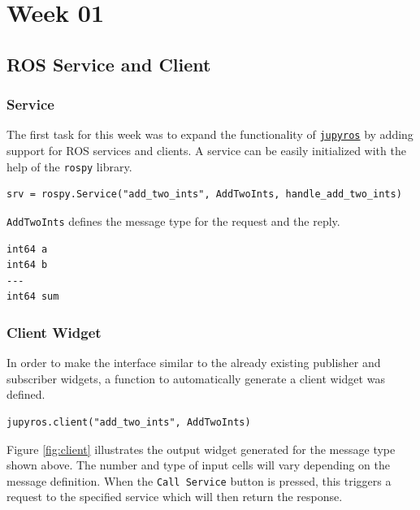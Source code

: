 \chapter{Week 01} %


\section{ROS Service and Client}

    \subsection{Service}
        The first task for this week was to expand the functionality of \href{https://github.com/RoboStack/jupyter-ros}{\texttt{jupyros}} by adding support for ROS services and clients. A service can be easily initialized with the help of the \texttt{rospy} library.
        
        \begin{lstlisting}
srv = rospy.Service("add_two_ints", AddTwoInts, handle_add_two_ints)
        \end{lstlisting}
        
        \noindent\texttt{AddTwoInts} defines the message type for the request and the reply. 
        
        \begin{lstlisting}
int64 a
int64 b
---
int64 sum
        \end{lstlisting}
    
    \subsection{Client Widget}
    
        In order to make the interface similar to the already existing publisher and subscriber widgets, a function to automatically generate a client widget was defined. 
    
        \begin{lstlisting}
jupyros.client("add_two_ints", AddTwoInts)
        \end{lstlisting}
        
        \noindent Figure \ref{fig:client} illustrates the output widget generated for the message type shown above. The number and type of input cells will vary depending on the message definition. When the \texttt{Call Service} button is pressed, this triggers a request to the specified service which will then return the response.
        
